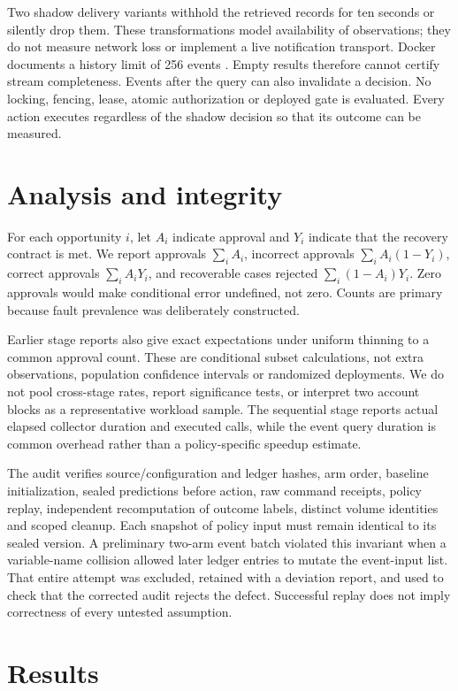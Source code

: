 \documentclass[manuscript,review,nonacm]{acmart}
\begin{document}
Two shadow delivery variants withhold the retrieved records for ten seconds or silently drop them. These transformations model availability of observations; they do not measure network loss or implement a live notification transport. Docker documents a history limit of 256 events \cite{docker}. Empty results therefore cannot certify stream completeness. Events after the query can also invalidate a decision. No locking, fencing, lease, atomic authorization or deployed gate is evaluated. Every action executes regardless of the shadow decision so that its outcome can be measured.

\section{Analysis and integrity}
For each opportunity $i$, let $A_i$ indicate approval and $Y_i$ indicate that the recovery contract is met. We report approvals $\sum_i A_i$, incorrect approvals $\sum_i A_i(1-Y_i)$, correct approvals $\sum_i A_iY_i$, and recoverable cases rejected $\sum_i(1-A_i)Y_i$. Zero approvals would make conditional error undefined, not zero. Counts are primary because fault prevalence was deliberately constructed.

Earlier stage reports also give exact expectations under uniform thinning to a common approval count. These are conditional subset calculations, not extra observations, population confidence intervals or randomized deployments. We do not pool cross-stage rates, report significance tests, or interpret two account blocks as a representative workload sample. The sequential stage reports actual elapsed collector duration and executed calls, while the event query duration is common overhead rather than a policy-specific speedup estimate.

The audit verifies source/configuration and ledger hashes, arm order, baseline initialization, sealed predictions before action, raw command receipts, policy replay, independent recomputation of outcome labels, distinct volume identities and scoped cleanup. Each snapshot of policy input must remain identical to its sealed version. A preliminary two-arm event batch violated this invariant when a variable-name collision allowed later ledger entries to mutate the event-input list. That entire attempt was excluded, retained with a deviation report, and used to check that the corrected audit rejects the defect. Successful replay does not imply correctness of every untested assumption.

\section{Results}
\end{document}
